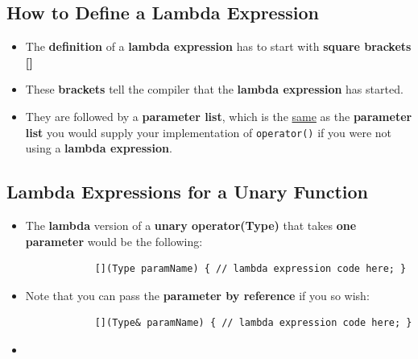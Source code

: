 \documentclass[10pt]{article}
\begin{document}
\newpage

\subsection{How to Define a Lambda Expression}
\begin{itemize}
	\item The \textbf{definition} of a \textbf{lambda expression} has to start with \textbf{square brackets []}  
	\item These \textbf{brackets} tell the compiler that the \textbf{lambda expression} has started.
	\item They are followed by a \textbf{parameter list}, which is the \underline{same} as the \textbf{parameter list} you would supply your implementation of \verb|operator()| if you were not using a \textbf{lambda expression}.
\end{itemize}

\newpage
\subsection{Lambda Expressions for a Unary Function}
\begin{itemize}
	\item The \textbf{lambda} version of a \textbf{unary operator(Type)} that takes \textbf{one parameter} would be the following:
		\begin{verbatim}
			[](Type paramName) { // lambda expression code here; }
		\end{verbatim}

	\item Note that you can pass the \textbf{parameter by reference} if you so wish:
		\begin{verbatim}
			[](Type& paramName) { // lambda expression code here; }
		\end{verbatim}

	\item {}
\end{itemize}


\newpage
\end{document}
